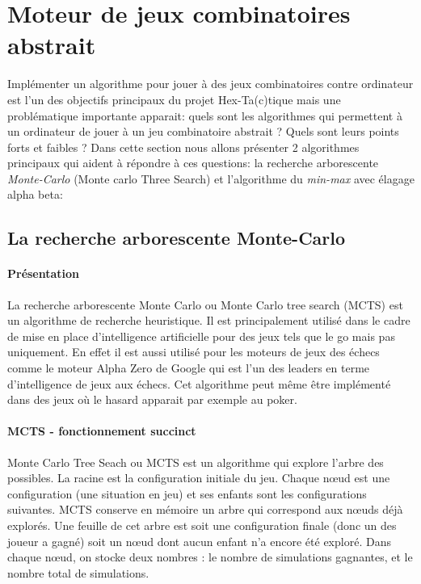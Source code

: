 \section{Moteur de jeux combinatoires abstrait}





Implémenter un algorithme pour jouer à des jeux combinatoires contre ordinateur est l'un des objectifs principaux du projet
Hex-Ta(c)tique mais une problématique importante apparait: quels sont les algorithmes qui permettent à un ordinateur
de jouer à un jeu combinatoire abstrait ? Quels sont leurs points forts et faibles ? Dans cette section nous allons
présenter 2 algorithmes principaux qui aident à répondre à ces questions: la recherche arborescente \emph{Monte-Carlo} (Monte carlo Three Search) 
et l'algorithme du \emph{min-max} avec élagage alpha beta:

\subsection{La recherche arborescente Monte-Carlo}

\paragraph{Présentation}
La recherche arborescente Monte Carlo ou Monte Carlo tree search (MCTS) est un algorithme de recherche heuristique.
Il est principalement utilisé dans le cadre de mise en place d'intelligence artificielle pour des jeux tels que le go mais pas uniquement.
En effet il est aussi utilisé pour les moteurs de jeux des échecs comme le moteur Alpha Zero de Google qui est
l'un des leaders en terme d'intelligence de jeux aux échecs. Cet algorithme peut même être implémenté dans des jeux où le hasard 
apparait par exemple au poker.

\paragraph{MCTS - fonctionnement succinct}
Monte Carlo Tree Seach ou MCTS est un algorithme qui explore l'arbre des possibles. La racine est la configuration initiale du jeu.
Chaque nœud est une configuration (une situation en jeu) et ses enfants sont les configurations suivantes. MCTS conserve en mémoire 
un arbre qui correspond aux nœuds déjà explorés. Une feuille de cet arbre est soit une configuration finale (donc un des joueur a gagné)
soit un nœud dont aucun enfant n'a encore été exploré. Dans chaque nœud, on stocke deux nombres : le nombre de simulations gagnantes, 
et le nombre total de simulations. 

